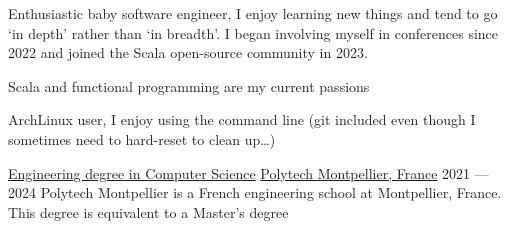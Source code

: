 \begin{MainPart}
  \color{Black}
  \vspace{0.25cm}
  {
    \vspace{-\baselineskip}
    \begin{flushleft}
      Enthusiastic baby software engineer, I enjoy learning new things and tend to go `in depth' rather than `in breadth'. I began involving myself in conferences since 2022 and joined the Scala open-source community in 2023.

      Scala and functional programming are my current passions

      ArchLinux user, I enjoy using the command line (git included even though I sometimes need to hard-reset to clean up\dots)
    \end{flushleft}
  }
  
  \Experience%
  {\href{https://www.polytech.umontpellier.fr/images/ecole/Plaquettes/SPECIALITE_IG_2018_EN.pdf}{Engineering degree in Computer Science}}
  {\href{https://english.polytech.umontpellier.fr/}{Polytech Montpellier, France}}
  {2021 --- 2024}
  {
    Polytech Montpellier is a French engineering school at Montpellier, France.\\
    This degree is equivalent to a Master's degree
  }

  \vspace{0.3cm}


\end{MainPart}
